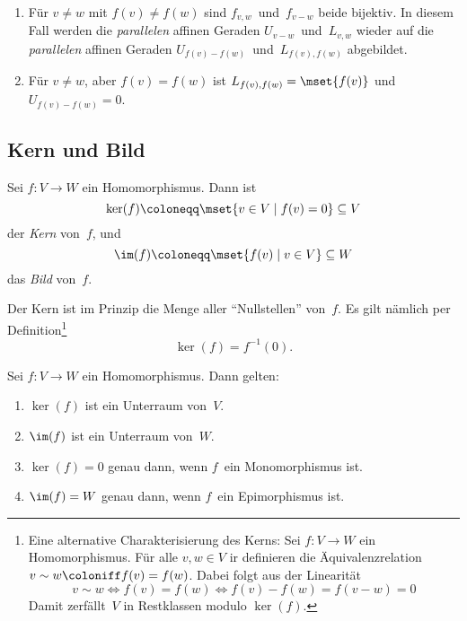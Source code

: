 \documentclass[a4paper]{article}
\begin{document}
\begin{remark}\leavevmode
    \begin{enumerate}
        \item Für $v \neq w$ mit $f(v) \neq f(w)$ sind $f_{v,w}$~und~$f_{v-w}$ beide bijektiv. In diesem Fall werden die \emph{parallelen} affinen Geraden $U_{v-w}$~und~$L_{v,w}$ wieder auf die \emph{parallelen} affinen Geraden $U_{f(v)-f(w)}$~und~$L_{f(v),f(w)}$ abgebildet.
        \item Für $v \neq w$, aber $f(v) = f(w)$ ist $L_{f(v),f(w)} = \mset{f(v)}$ und $U_{f(v)-f(w)} = 0$.
    \end{enumerate}
\end{remark}

\subsection{Kern und Bild}

\begin{definition}
    Sei $f\colon V \to W$ ein Homomorphismus. Dann ist
    \begin{equation*}
        \ker(f) \coloneqq \mset{v \in V \mid f(v) = 0} \subseteq V
    \end{equation*}
    der \emph{Kern} von~$f$, und
    \begin{equation*}
        \im(f) \coloneqq \mset{f(v) \mid v \in V} \subseteq W
    \end{equation*}
    das \emph{Bild} von~$f$.
\end{definition}

Der Kern ist im Prinzip die Menge aller "`Nullstellen"' von~$f$. Es gilt nämlich per Definition\footnote{Eine alternative Charakterisierung des Kerns: Sei $f\colon V \to W$ ein Homomorphismus. Für alle $v,w \in V$ ir definieren die Äquivalenzrelation $v \sim w \coloniff f(v) = f(w)$. Dabei folgt aus der Linearität
    \begin{equation*}
        v \sim w \iff f(v) = f(w) \iff f(v)-f(w) = f(v-w) = 0
    \end{equation*}
    Damit zerfällt~$V$ in Restklassen modulo $\ker(f)$.}
\begin{equation*}
    \ker(f) = f^{-1}(0).
\end{equation*}

\begin{lemma}\label{lem:kerim:properties}
    Sei $f\colon V \to W$ ein Homomorphismus. Dann gelten:
    \begin{enumerate}
        \item $\ker(f)$ ist ein Unterraum von~$V$.
        \item $\im(f)$ ist ein Unterraum von~$W$.
        \item $\ker(f) = 0$ genau dann, wenn $f$~ein Monomorphismus ist.
        \item $\im(f) = W$ genau dann, wenn $f$~ein Epimorphismus ist.
    \end{enumerate}
\end{lemma}
\end{document}
